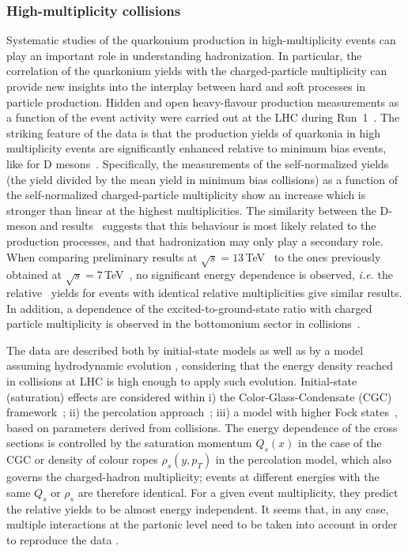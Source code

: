 \documentclass[../report.tex]{subfiles}
\begin{document}
\subsubsection{High-multiplicity \pp collisions} %

Systematic studies of the quarkonium production in high-multiplicity \pp events can play an important role in understanding hadronization.
In particular, the correlation of the quarkonium yields with the charged-particle multiplicity can provide new insights into the interplay between hard and soft processes in particle production.
Hidden and open heavy-flavour production measurements as a function of the event activity were carried out  at the LHC during Run~1~\cite{Abelev:2012rz,Chatrchyan:2013nza}.
The striking feature of the data is that the production yields of quarkonia in high multiplicity events are significantly enhanced relative to minimum bias events, like for D mesons~\cite{Adam:2015ota}.
Specifically, the measurements of the self-normalized yields (the yield divided by the mean yield in minimum bias collisions) as a function of the self-normalized charged-particle multiplicity show an increase which is stronger than linear at the highest multiplicities.
The similarity between the D-meson and \PJgy results~\cite{Abelev:2012rz,Adam:2015ota} suggests that this behaviour is most likely related to the production processes, and that hadronization may only play a secondary role.
When comparing \PJgy preliminary results at $\sqrt{s}=13$\,TeV~\cite{Weber:2017hhm} to the ones previously obtained at $\sqrt{s} = 7$\,TeV~\cite{Abelev:2012rz}, no significant energy dependence is observed, {\it i.e.} the relative \PJgy~yields for events with identical relative multiplicities give similar results. In addition, a dependence of the excited-to-ground-state ratio with charged particle multiplicity is observed in the bottomonium sector in \pp collisions~\cite{Chatrchyan:2013nza,CMS-PAS-BPH-14-009}.

The data are described both by initial-state models as well as by a model assuming hydrodynamic evolution \cite{Werner:2013tya}, considering that the energy density reached in \pp collisions at LHC is high enough to apply such evolution.
Initial-state (saturation) effects are considered within
i) the Color-Glass-Condensate (CGC) framework~\cite{Ma:2018bax}; ii) the percolation approach~\cite{Ferreiro:2012fb,Ferreiro:2015gea}; iii) a model with higher Fock states~\cite{Kopeliovich:2013yfa}, based on parameters derived from \pPb collisions.
The energy dependence of the cross sections is controlled by the saturation momentum $Q_s(x)$ in the case of the CGC or density of colour ropes $\rho_s(y,p_T)$ in the percolation model, which also governs the charged-hadron multiplicity; events at different energies with the same $Q_s$ or $\rho_s$ are therefore identical.
For a given event multiplicity, they predict the relative yields to be almost energy independent.
It seems that, in any case, multiple interactions at the partonic level need to be taken into account in order to reproduce the data \cite{Sjostrand:2014zea,Skands:2014pea,Sjostrand:2017cdm}.
\end{document}
